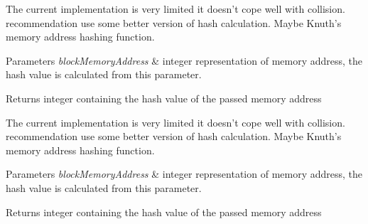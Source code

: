 \begin{DoxyRefList}
\item[\label{todo__todo000003}%
\hypertarget{todo__todo000003}{}%
Member \hyperlink{transaction_8h_a13fcff2b52d3512807dedb55ce61e735}{A\+K\+\_\+memory\+\_\+block\+\_\+hash} (int)]The current implementation is very limited it doesn't cope well with collision. recommendation use some better version of hash calculation. Maybe Knuth's memory address hashing function. 
\begin{DoxyParams}{Parameters}
{\em block\+Memory\+Address} & integer representation of memory address, the hash value is calculated from this parameter. \\
\hline
\end{DoxyParams}
\begin{DoxyReturn}{Returns}
integer containing the hash value of the passed memory address  
\end{DoxyReturn}

\item[\label{todo__todo000003}%
\hypertarget{todo__todo000003}{}%
Member \hyperlink{transaction_8h_a13fcff2b52d3512807dedb55ce61e735}{A\+K\+\_\+memory\+\_\+block\+\_\+hash} (int)]The current implementation is very limited it doesn't cope well with collision. recommendation use some better version of hash calculation. Maybe Knuth's memory address hashing function. 
\begin{DoxyParams}{Parameters}
{\em block\+Memory\+Address} & integer representation of memory address, the hash value is calculated from this parameter. \\
\hline
\end{DoxyParams}
\begin{DoxyReturn}{Returns}
integer containing the hash value of the passed memory address 
\end{DoxyReturn}

\end{DoxyRefList}